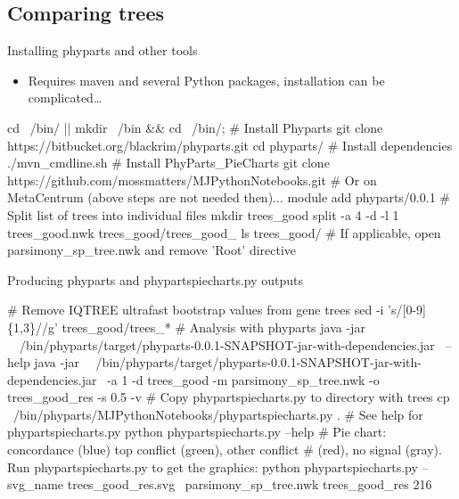 \documentclass[compress,  xelatex, 11pt, xcolor=x11names, aspectratio=169,
	hyperref={
		bookmarks=true,
		unicode=true,
		colorlinks=true,
		pdftitle={HybSeq course},
		plainpages=false,
		pdfauthor={Vojtech Zeisek},
		pdfsubject={Practical processing of HybSeq target enrichment sequencing data on computing grids like MetaCentrum},
		pdfcreator={XeLaTeX},
		pdfkeywords={BASH, command line, GNU, HybSeq, Linux, MetaCentrum, sequencing shell, target enrichment},
		linkcolor=Turquoise4, %
		anchorcolor=DodgerBlue4, %
		citecolor=DodgerBlue4, %
		filecolor=DodgerBlue4, %
		menucolor=Tan4, %
		urlcolor=DarkOliveGreen4 %
		},
	url={hyphens, lowtilde} %
	]{beamer}
\renewcommand{\texttt}[1]{\colorbox{Cornsilk2}{{\ttfamily #1}}}
\begin{document}
\subsection{Comparing trees}

\begin{frame}[fragile]{Installing phyparts and other tools}
	\begin{itemize}
		\item Requires \texttt{maven} and several Python packages, installation can be complicated\ldots
	\end{itemize}
	\begin{bashcode}
    cd ~/bin/ || { mkdir ~/bin && cd ~/bin/; }
    # Install Phyparts
    git clone https://bitbucket.org/blackrim/phyparts.git
    cd phyparts/
    # Install dependencies
    ./mvn_cmdline.sh
    # Install PhyParts_PieCharts
    git clone https://github.com/mossmatters/MJPythonNotebooks.git
    # Or on MetaCentrum (above steps are not needed then)...
    module add phyparts/0.0.1
    # Split list of trees into individual files
    mkdir trees_good
    split -a 4 -d -l 1 trees_good.nwk trees_good/trees_good_
    ls trees_good/
    # If applicable, open parsimony_sp_tree.nwk and remove 'Root' directive
	\end{bashcode}
\end{frame}

\begin{frame}[fragile]{Producing phyparts and phypartspiecharts.py outputs}
	\begin{bashcode}
    # Remove IQTREE ultrafast bootstrap values from gene trees
    sed -i 's/\/[0-9]\{1,3\}//g' trees_good/trees_*
    # Analysis with phyparts
    java -jar \
      ~/bin/phyparts/target/phyparts-0.0.1-SNAPSHOT-jar-with-dependencies.jar \
      --help
    java -jar \
      ~/bin/phyparts/target/phyparts-0.0.1-SNAPSHOT-jar-with-dependencies.jar \
      -a 1 -d trees_good -m parsimony_sp_tree.nwk -o trees_good_res -s 0.5 -v
    # Copy phypartspiecharts.py to directory with trees
    cp ~/bin/phyparts/MJPythonNotebooks/phypartspiecharts.py .
    # See help for phypartspiecharts.py
    python phypartspiecharts.py --help
    # Pie chart: concordance (blue) top conflict (green), other conflict
    # (red), no signal (gray). Run phypartspiecharts.py to get the graphics:
    python phypartspiecharts.py --svg_name trees_good_res.svg \
      parsimony_sp_tree.nwk trees_good_res 216
	\end{bashcode}
\end{frame}
\end{document}

